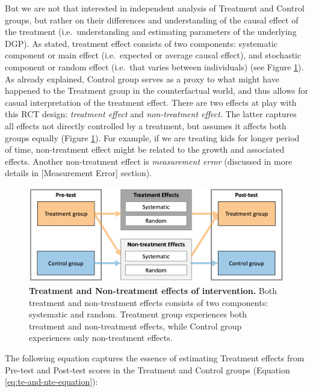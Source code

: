 \documentclass[
]{book}
\begin{document}
But we are not that interested in independent analysis of Treatment and Control groups, but rather on their differences and understanding of the causal effect of the treatment (i.e.~understanding and estimating parameters of the underlying DGP). As stated, treatment effect consists of two components: systematic component or main effect (i.e.~expected or average causal effect), and stochastic component or random effect (i.e.~that varies between individuals) (see Figure \ref{fig:te-and-nte-diagram}). As already explained, Control group serves as a proxy to what might have happened to the Treatment group in the counterfactual world, and thus allows for casual interpretation of the treatment effect. There are two effects at play with this RCT design: \emph{treatment effect} and \emph{non-treatment effect}. The latter captures all effects not directly controlled by a treatment, but assumes it affects both groups equally (Figure \ref{fig:te-and-nte-diagram}). For example, if we are treating kids for longer period of time, non-treatment effect might be related to the growth and associated effects. Another non-treatment effect is \emph{measurement error} (discussed in more details in {[}Measurement Error{]} section).

\begin{figure}

{\centering \includegraphics[width=1\linewidth]{figures/treatment-and-non-treatment-effects} 

}

\caption{\textbf{Treatment and Non-treatment effects of intervention.} Both treatment and non-treatment effects consists of two components: systematic and random. Treatment group experiences both treatment and non-treatment effects, while Control group experiences only non-treatment effects.}\label{fig:te-and-nte-diagram}
\end{figure}



The following equation captures the essence of estimating Treatment effects from Pre-test and Post-test scores in the Treatment and Control groups (Equation \eqref{eq:te-and-nte-equation}):
\end{document}
